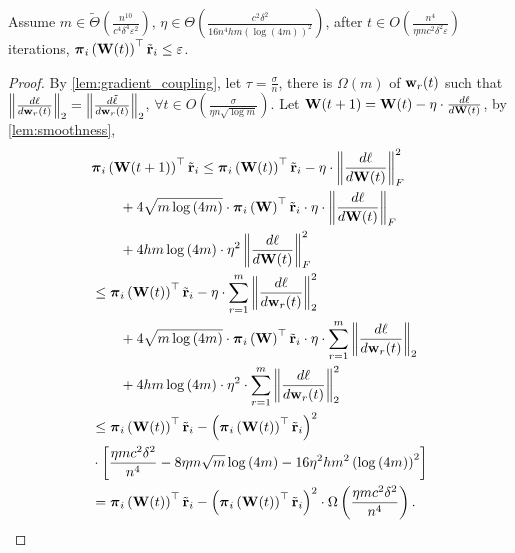 \begin{thm}
\label{thm:regret_convergence}
    Assume $m \in \tilde{\Theta}\left( \frac{n^{10}}{c^4 \delta^4 \varepsilon^2} \right)$, $\eta \in \Theta\left( \frac{c^2 \delta^2}{16 n^4 h m \left( \log{\left(4m\right)} \right)^2} \right)$, after $t \in O\left( \frac{n^4}{\eta m c^2 \delta^2 \varepsilon} \right)$ iterations, ${\boldsymbol{\pi}}_i\left( {\mathbf{W}}(t) \right)^\top {\tilde{\mathbf{r}}}_i \le \varepsilon$.
\end{thm}
\begin{proof}
    By \cref{lem:gradient_coupling}, let $\tau = \frac{\sigma}{n}$, there is $\Omega\left( m \right)$ of ${\mathbf{w}}_r(t)$ such that $\left\| \frac{d\ell}{d {\mathbf{w}}_r(t)} \right\|_2 = \left\| \frac{d\tilde{\ell}}{d {\mathbf{w}}_r(t)} \right\|_2$, $\forall t \in O\left( \frac{\sigma}{\eta n \sqrt{\log{m}}} \right)$. Let ${\mathbf{W}}(t+1) = {\mathbf{W}}(t) - \eta \cdot \frac{d \ell}{d {\mathbf{W}}(t)}$, by \cref{lem:smoothness},
\begin{equation*}
\begin{split}
    &\rvpi_i\left( \rmW(t+1) \right)^\top \rvtilder_i \le \rvpi_i\left( \rmW(t) \right)^\top \rvtilder_i - \eta \cdot \left\| \frac{d \ell}{d \rmW(t)} \right\|_F^2 \\
    &\qquad + 4 \sqrt{m \log{\left(4m\right)}} \cdot \rvpi_i\left( \rmW \right)^\top \rvtilder_i \cdot \eta \cdot \left\| \frac{d \ell}{d \rmW(t)} \right\|_F \\
    &\qquad + 4 h m \log{\left(4m\right)} \cdot \eta^2 \left\| \frac{d \ell}{d \rmW(t)} \right\|_F^2 \\
    &\le \rvpi_i\left( \rmW(t) \right)^\top \rvtilder_i - \eta \cdot \sum\limits_{r=1}^{m}{ \left\| \frac{d\ell}{d \rvw_r(t)} \right\|_2^2 } \\
    &\qquad + 4 \sqrt{m \log{\left(4m\right)}} \cdot \rvpi_i\left( \rmW \right)^\top \rvtilder_i \cdot \eta \cdot \sum\limits_{r=1}^{m}{ \left\| \frac{d\ell}{d \rvw_r(t)} \right\|_2 } \\
    &\qquad + 4 h m \log{\left(4m\right)} \cdot \eta^2 \cdot \sum\limits_{r=1}^{m}{ \left\| \frac{d\ell}{d \rvw_r(t)} \right\|_2^2 } \\
    &\le \rvpi_i\left( \rmW(t) \right)^\top \rvtilder_i - \left( \rvpi_i\left( \rmW(t) \right)^\top \rvtilder_i \right)^2 \\
    &\cdot \left[ \frac{\eta m c^2 \delta^2}{n^4} - 8 \eta m \sqrt{m} \log{\left(4m\right)} - 16 \eta^2 h m^2 \left( \log{\left(4m\right)} \right)^2 \right] \\
    &= \rvpi_i\left( \rmW(t) \right)^\top \rvtilder_i - \left( \rvpi_i\left( \rmW(t) \right)^\top \rvtilder_i \right)^2 \cdot \Omega\left( \frac{\eta m c^2 \delta^2}{n^4} \right).

\end{split}
\end{equation*}
\end{proof}
